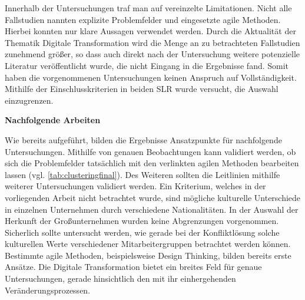 Innerhalb der Untersuchungen traf man auf vereinzelte Limitationen. Nicht alle Fallstudien nannten explizite Problemfelder und eingesetzte agile Methoden. Hierbei konnten nur klare Aussagen verwendet werden. Durch die Aktualität der Thematik Digitale Transformation wird die Menge an zu betrachteten Fallstudien zunehmend größer, so dass auch direkt nach der Untersuchung weitere potenzielle Literatur veröffentlicht wurde, die nicht Eingang in die Ergebnisse fand. Somit haben die vorgenommenen Untersuchungen keinen Anspruch auf Vollständigkeit. Mithilfe der Einschlusskriterien in beiden SLR wurde versucht,  die Auswahl einzugrenzen.

\textbf{Nachfolgende Arbeiten} 

Wie bereits aufgeführt, bilden die Ergebnisse Ansatzpunkte für nachfolgende Untersuchungen. Mithilfe von genauen Beobachtungen kann validiert werden, ob sich die Problemfelder tatsächlich mit den verlinkten agilen Methoden bearbeiten lassen (vgl. \ref{tab:clusteringfinal}). Des Weiteren sollten die Leitlinien mithilfe weiterer Untersuchungen validiert werden. Ein Kriterium, welches in der vorliegenden Arbeit nicht betrachtet wurde, sind mögliche kulturelle Unterschiede in einzelnen Unternehmen durch verschiedene Nationalitäten. In der Auswahl der Herkunft der Großunternehmen wurden keine Abgrenzungen vorgenommen. Sicherlich sollte untersucht werden, wie gerade bei der Konfliktlösung solche kulturellen Werte verschiedener Mitarbeitergruppen betrachtet werden können. Bestimmte agile Methoden, beispielsweise Design Thinking, bilden bereits erste Ansätze. Die Digitale Transformation bietet ein breites Feld für genaue Untersuchungen, gerade hinsichtlich den mit ihr einhergehenden Veränderungsprozessen.